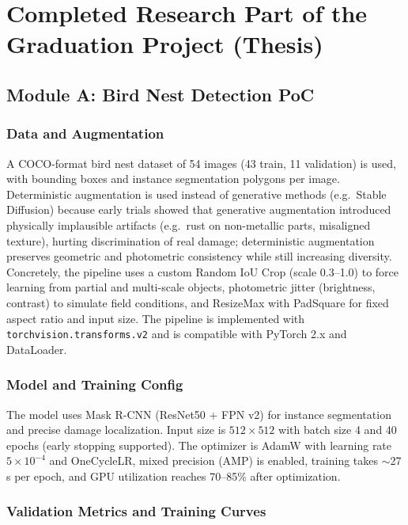 \documentclass[12pt,a4paper]{article}
\begin{document}
\section{Completed Research Part of the Graduation Project (Thesis)}

\subsection{Module A: Bird Nest Detection PoC}

\subsubsection{Data and Augmentation}

A COCO-format bird nest dataset of 54 images (43 train, 11 validation) is used, with bounding boxes and instance segmentation polygons per image. Deterministic augmentation is used instead of generative methods (e.g.\ Stable Diffusion) because early trials showed that generative augmentation introduced physically implausible artifacts (e.g.\ rust on non-metallic parts, misaligned texture), hurting discrimination of real damage; deterministic augmentation preserves geometric and photometric consistency while still increasing diversity. Concretely, the pipeline uses a custom Random IoU Crop (scale 0.3--1.0) to force learning from partial and multi-scale objects, photometric jitter (brightness, contrast) to simulate field conditions, and ResizeMax with PadSquare for fixed aspect ratio and input size. The pipeline is implemented with \texttt{torchvision.transforms.v2} and is compatible with PyTorch 2.x and DataLoader.

\subsubsection{Model and Training Config}

The model uses Mask R-CNN (ResNet50 + FPN v2) for instance segmentation and precise damage localization. Input size is $512\times512$ with batch size 4 and 40 epochs (early stopping supported). The optimizer is AdamW with learning rate $5\times10^{-4}$ and OneCycleLR, mixed precision (AMP) is enabled, training takes $\sim$27\,s per epoch, and GPU utilization reaches 70--85\% after optimization.

\subsubsection{Validation Metrics and Training Curves}
\end{document}
